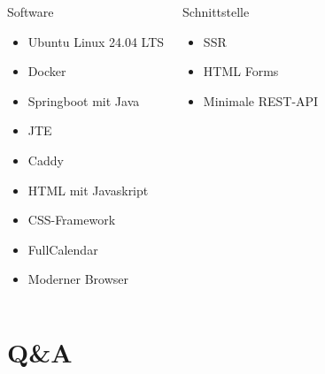 \documentclass{sdqbeamer}
\begin{document}
\begin{frame}{\insertsubsectionhead}
    \begin{columns}
        \begin{greenblock}{Software}
            \begin{itemize}
                \item Ubuntu Linux 24.04 LTS 
                \item Docker
                \item Springboot mit Java 
                \item JTE
                \item Caddy
                \item HTML mit Javaskript
                \item CSS-Framework
                \item FullCalendar
                \item Moderner Browser
            \end{itemize}
        \end{greenblock}
        \begin{greenblock}{Schnittstelle}
            \begin{itemize}
                \item SSR
                \item HTML Forms
                \item Minimale REST-API
            \end{itemize}
        \end{greenblock}
    \end{columns}
\end{frame}

\section{Q\&A}
\end{document}
